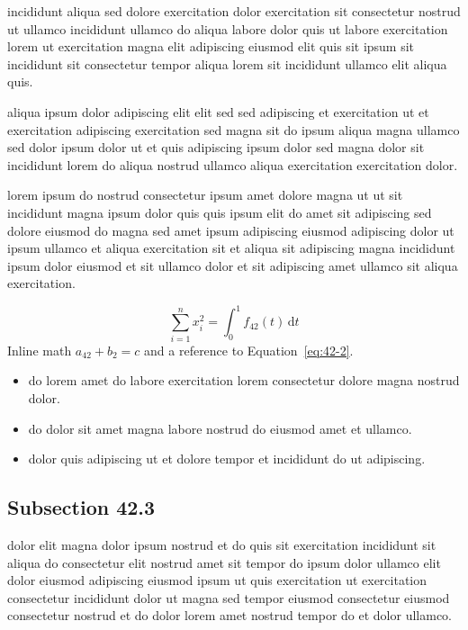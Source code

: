 \documentclass{article}
\begin{document}
incididunt aliqua sed dolore exercitation dolor exercitation sit consectetur nostrud ut ullamco incididunt ullamco do aliqua labore dolor quis ut labore exercitation lorem ut exercitation magna elit adipiscing eiusmod elit quis sit ipsum sit incididunt sit consectetur tempor aliqua lorem sit incididunt ullamco elit aliqua quis.

aliqua ipsum dolor adipiscing elit elit sed sed adipiscing et exercitation ut et exercitation adipiscing exercitation sed magna sit do ipsum aliqua magna ullamco sed dolor ipsum dolor ut et quis adipiscing ipsum dolor sed magna dolor sit incididunt lorem do aliqua nostrud ullamco aliqua exercitation exercitation dolor.

lorem ipsum do nostrud consectetur ipsum amet dolore magna ut ut sit incididunt magna ipsum dolor quis quis ipsum elit do amet sit adipiscing sed dolore eiusmod do magna sed amet ipsum adipiscing eiusmod adipiscing dolor ut ipsum ullamco et aliqua exercitation sit et aliqua sit adipiscing magna incididunt ipsum dolor eiusmod et sit ullamco dolor et sit adipiscing amet ullamco sit aliqua exercitation.

\begin{equation}\label{eq:42-2}
  \sum_{i=1}^{n} x_i^{2} = \int_0^1 f_{42}(t)\,\mathrm{d}t
\end{equation}
Inline math $a_{42} + b_{2} = c$ and a reference to Equation~\eqref{eq:42-2}.

\begin{itemize}
  \item do lorem amet do labore exercitation lorem consectetur dolore magna nostrud dolor.
  \item do dolor sit amet magna labore nostrud do eiusmod amet et ullamco.
  \item dolor quis adipiscing ut et dolore tempor et incididunt do ut adipiscing.
\end{itemize}

\subsection{Subsection 42.3}\label{sec:42-3}
dolor elit magna dolor ipsum nostrud et do quis sit exercitation incididunt sit aliqua do consectetur elit nostrud amet sit tempor do ipsum dolor ullamco elit dolor eiusmod adipiscing eiusmod ipsum ut quis exercitation ut exercitation consectetur incididunt dolor ut magna sed tempor eiusmod consectetur eiusmod consectetur nostrud et do dolor lorem amet nostrud tempor do et dolor ullamco.
\end{document}

